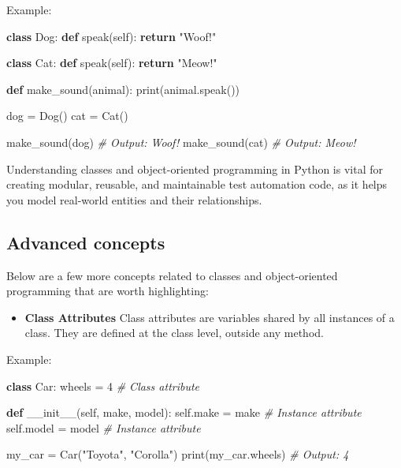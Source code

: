 \documentclass[
  paper=a4,
  ,captions=tableheading
]{scrartcl}
\newenvironment{Shaded}{}{}
\newcommand{\BuiltInTok}[1]{\textcolor[rgb]{0.00,0.50,0.00}{#1}}
\newcommand{\CommentTok}[1]{\textcolor[rgb]{0.38,0.63,0.69}{\textit{#1}}}
\newcommand{\ControlFlowTok}[1]{\textcolor[rgb]{0.00,0.44,0.13}{\textbf{#1}}}
\newcommand{\DecValTok}[1]{\textcolor[rgb]{0.25,0.63,0.44}{#1}}
\newcommand{\FunctionTok}[1]{\textcolor[rgb]{0.02,0.16,0.49}{#1}}
\newcommand{\KeywordTok}[1]{\textcolor[rgb]{0.00,0.44,0.13}{\textbf{#1}}}
\newcommand{\NormalTok}[1]{#1}
\newcommand{\OperatorTok}[1]{\textcolor[rgb]{0.40,0.40,0.40}{#1}}
\newcommand{\StringTok}[1]{\textcolor[rgb]{0.25,0.44,0.63}{#1}}
\newcommand{\VariableTok}[1]{\textcolor[rgb]{0.10,0.09,0.49}{#1}}
\providecommand{\tightlist}{%
  \setlength{\itemsep}{0pt}\setlength{\parskip}{0pt}}
\begin{document}
Example:

\begin{Shaded}
\begin{Highlighting}[]
\KeywordTok{class}\NormalTok{ Dog:}
    \KeywordTok{def}\NormalTok{ speak(}\VariableTok{self}\NormalTok{):}
        \ControlFlowTok{return} \StringTok{"Woof!"}

\KeywordTok{class}\NormalTok{ Cat:}
    \KeywordTok{def}\NormalTok{ speak(}\VariableTok{self}\NormalTok{):}
        \ControlFlowTok{return} \StringTok{"Meow!"}

\KeywordTok{def}\NormalTok{ make\_sound(animal):}
    \BuiltInTok{print}\NormalTok{(animal.speak())}

\NormalTok{dog }\OperatorTok{=}\NormalTok{ Dog()}
\NormalTok{cat }\OperatorTok{=}\NormalTok{ Cat()}

\NormalTok{make\_sound(dog)  }\CommentTok{\# Output: Woof!}
\NormalTok{make\_sound(cat)  }\CommentTok{\# Output: Meow!}
\end{Highlighting}
\end{Shaded}

Understanding classes and object-oriented programming in Python is vital
for creating modular, reusable, and maintainable test automation code,
as it helps you model real-world entities and their relationships.

\hypertarget{advanced-concepts}{%
\subsection{Advanced concepts}\label{advanced-concepts}}

Below are a few more concepts related to classes and object-oriented
programming that are worth highlighting:

\begin{itemize}
\tightlist
\item
  \textbf{Class Attributes} Class attributes are variables shared by all
  instances of a class. They are defined at the class level, outside any
  method.
\end{itemize}

Example:

\begin{Shaded}
\begin{Highlighting}[]
\KeywordTok{class}\NormalTok{ Car:}
\NormalTok{    wheels }\OperatorTok{=} \DecValTok{4}  \CommentTok{\# Class attribute}

    \KeywordTok{def} \FunctionTok{\_\_init\_\_}\NormalTok{(}\VariableTok{self}\NormalTok{, make, model):}
        \VariableTok{self}\NormalTok{.make }\OperatorTok{=}\NormalTok{ make  }\CommentTok{\# Instance attribute}
        \VariableTok{self}\NormalTok{.model }\OperatorTok{=}\NormalTok{ model  }\CommentTok{\# Instance attribute}

\NormalTok{my\_car }\OperatorTok{=}\NormalTok{ Car(}\StringTok{"Toyota"}\NormalTok{, }\StringTok{"Corolla"}\NormalTok{)}
\BuiltInTok{print}\NormalTok{(my\_car.wheels)  }\CommentTok{\# Output: 4}
\end{Highlighting}
\end{Shaded}
\end{document}
